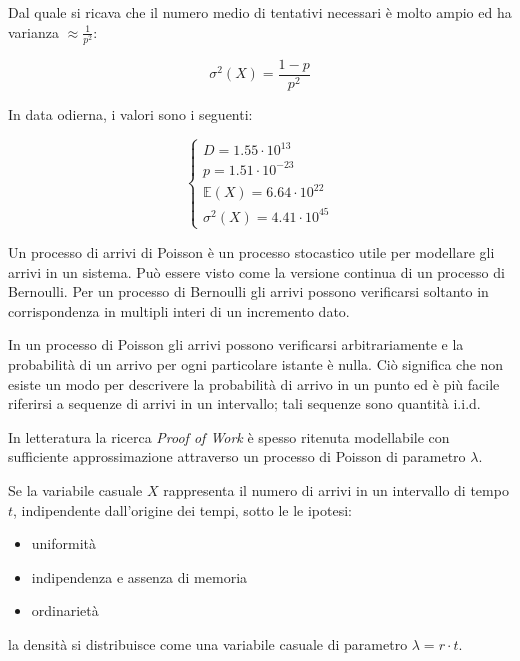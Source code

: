 \documentclass{article}
\begin{document}
Dal quale si ricava che il numero medio di tentativi necessari è molto ampio ed ha varianza $\approx \frac{1}{p^{2}}$:

\begin{equation}
    \sigma^{2}(X) = \frac{1 - p}{p^2} \label{varianza}
\end{equation}

In data odierna, i valori sono i seguenti:

\begin{equation}
    \left \{
        \begin{array}{ll}
            D = 1.55 \cdot 10^{13} \\
            p = 1.51 \cdot 10^{-23} \\
            \mathbb{E}(X) = 6.64 \cdot 10^{22}\\
            \sigma^{2}(X) = 4.41 \cdot 10^{45}
        \end{array}
    \right .
\end{equation}

Un processo di arrivi di Poisson è un processo stocastico utile per modellare gli arrivi in un sistema. Può essere visto come la versione continua di un processo di Bernoulli. Per un processo di Bernoulli gli arrivi possono verificarsi soltanto in corrispondenza in multipli interi di un incremento dato.

In un processo di Poisson gli arrivi possono verificarsi arbitrariamente e la probabilità di un arrivo per ogni particolare istante è nulla. 
Ciò significa che non esiste un modo per descrivere la probabilità di arrivo in un punto ed è più facile riferirsi a sequenze di arrivi in un intervallo; tali sequenze sono quantità i.i.d.

In letteratura la ricerca \textit{Proof of Work} è spesso ritenuta modellabile con sufficiente approssimazione attraverso un processo di Poisson di parametro $\lambda$.

Se la variabile casuale $X$ rappresenta il numero di arrivi in un intervallo di tempo $t$, indipendente dall'origine dei tempi, sotto le le ipotesi:

\begin{itemize}
    \item uniformità
    \item indipendenza e assenza di memoria
    \item ordinarietà
\end{itemize}

la densità si distribuisce come una variabile casuale di parametro $\lambda = r \cdot t$.
\end{document}
